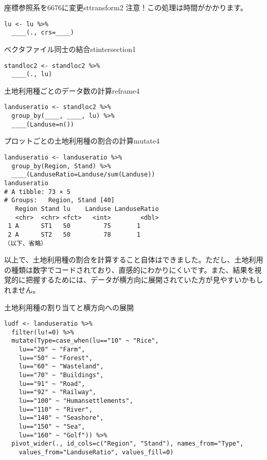 \begin{exercise}{座標参照系を6676に変更}{sttransform2}
注意！この処理は時間がかかります。
\begin{verbatim}
lu <- lu %>%
  ____(., crs=____)
\end{verbatim}
\end{exercise}

\begin{exercise}{ベクタファイル同士の結合}{stintersection1}
\begin{verbatim}
standloc2 <- standloc2 %>%
  ____(., lu)
\end{verbatim}
\end{exercise}

\begin{exercise}{土地利用種ごとのデータ数の計算}{reframe4}
\begin{verbatim}
landuseratio <- standloc2 %>%
  group_by(____, ____, lu) %>%
  ____(Landuse=n())
\end{verbatim}
\end{exercise}

\begin{exercise}{プロットごとの土地利用種の割合の計算}{mutate4}
\begin{verbatim}
landuseratio <- landuseratio %>%
  group_by(Region, Stand) %>%
  ____(LanduseRatio=Landuse/sum(Landuse))
landuseratio
# A tibble: 73 × 5
# Groups:   Region, Stand [40]
   Region Stand lu    Landuse LanduseRatio
   <chr>  <chr> <fct>   <int>        <dbl>
 1 A      ST1   50         75       1     
 2 A      ST2   50         78       1     
（以下、省略）
\end{verbatim}
\end{exercise}
以上で、土地利用種の割合を計算すること自体はできました。ただし、土地利用の種類は数字でコードされており、直感的にわかりにくいです。また、結果を視覚的に把握するためには、データが横方向に展開されていた方が見やすいかもしれません。

\begin{itembox}[l]{土地利用種の割り当てと横方向への展開}
\begin{verbatim}
ludf <- landuseratio %>%
  filter(lu!=0) %>%
  mutate(Type=case_when(lu=="10" ~ "Rice",
    lu=="20" ~ "Farm",
    lu=="50" ~ "Forest",
    lu=="60" ~ "Wasteland",
    lu=="70" ~ "Buildings",
    lu=="91" ~ "Road",
    lu=="92" ~ "Railway",
    lu=="100" ~ "Humansettlements",
    lu=="110" ~ "River",
    lu=="140" ~ "Seashore",
    lu=="150" ~ "Sea",
    lu=="160" ~ "Golf")) %>%
  pivot_wider(., id_cols=c("Region", "Stand"), names_from="Type",
    values_from="LanduseRatio", values_fill=0)
\end{verbatim}
\end{itembox}

